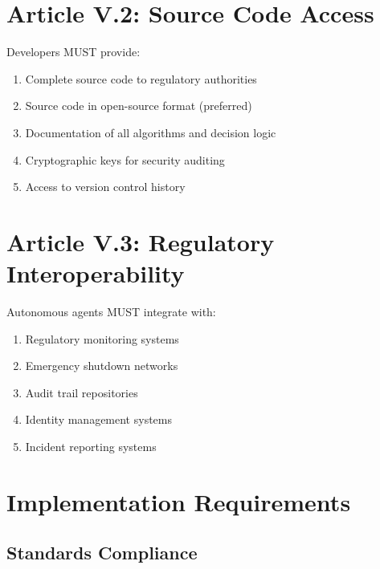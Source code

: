 \section{Article V.2: Source Code Access}

\begin{articlebox}
Developers MUST provide:
\begin{enumerate}
    \item Complete source code to regulatory authorities
    \item Source code in open-source format (preferred)
    \item Documentation of all algorithms and decision logic
    \item Cryptographic keys for security auditing
    \item Access to version control history
\end{enumerate}
\end{articlebox}

\vspace{0.5cm}

\section{Article V.3: Regulatory Interoperability}

\begin{articlebox}
Autonomous agents MUST integrate with:
\begin{enumerate}
    \item Regulatory monitoring systems
    \item Emergency shutdown networks
    \item Audit trail repositories
    \item Identity management systems
    \item Incident reporting systems
\end{enumerate}
\end{articlebox}

\vspace{0.5cm}

\section{Implementation Requirements}

\subsection{Standards Compliance}

